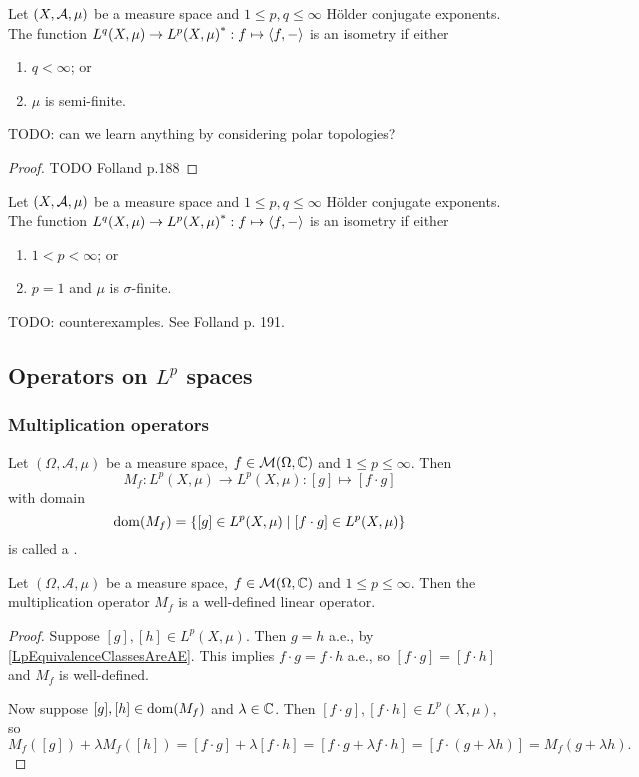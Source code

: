 \begin{proposition}
Let $\sSet{X, \mathcal{A}, \mu}$ be a measure space and $1 \leq p,q\leq \infty$ Hölder conjugate exponents. The function $L^q(X,\mu)\to {L^p(X,\mu)}^*: f \mapsto \left\langle f,- \right\rangle$ is an isometry if either
\begin{enumerate}
\item $q<\infty$; or
\item $\mu$ is semi-finite.
\end{enumerate}
\end{proposition}
TODO: can we learn anything by considering polar topologies?
\begin{proof}
TODO Folland p.188
\end{proof}

\begin{proposition}
Let $\sSet{X, \mathcal{A}, \mu}$ be a measure space and $1\leq p,q \leq \infty$ Hölder conjugate exponents. The function $L^q(X,\mu)\to {L^p(X,\mu)}^*: f \mapsto \left\langle f,- \right\rangle$ is an isometry if either
\begin{enumerate}
\item $1<p<\infty$; or
\item $p=1$ and $\mu$ is $\sigma$-finite.
\end{enumerate}
\end{proposition}

\begin{example}
TODO: counterexamples. See Folland p. 191.
\end{example}

\subsection{Operators on $L^p$ spaces}
\subsubsection{Multiplication operators}
\begin{definition}
Let $(\Omega, \mathcal{A}, \mu)$ be a measure space, $f\in \operatorname{\mathcal{M}}(\Omega, \mathbb{C})$ and $1\leq p \leq \infty$. Then
\[ M_f: L^p(X, \mu) \to L^p(X, \mu): [g]\mapsto [f\cdot g] \]
with domain
\[ \dom(M_f) = \setbuilder{[g]\in L^p(X, \mu)}{[f\cdot g] \in L^p(X, \mu)} \]
is called a .
\end{definition}

\begin{lemma}
Let $(\Omega, \mathcal{A}, \mu)$ be a measure space, $f\in \operatorname{\mathcal{M}}(\Omega, \mathbb{C})$ and $1\leq p \leq \infty$. Then the multiplication operator $M_f$ is a well-defined linear operator.
\end{lemma}
\begin{proof}
Suppose $[g], [h] \in L^p(X, \mu)$. Then $g = h$ a.e., by \ref{LpEquivalenceClassesAreAE}. This implies $f\cdot g = f\cdot h$ a.e., so $[f\cdot g] = [f\cdot h]$ and $M_f$ is well-defined.

Now suppose $[g],[h] \in \operatorname{dom}(M_f)$ and $\lambda \in \mathbb{C}$. Then $[f\cdot g], [f\cdot h] \in L^p(X, \mu)$, so
\[ M_f([g]) + \lambda M_f([h]) = [f\cdot g] + \lambda[f\cdot h] = [f\cdot g + \lambda f\cdot h] = [f\cdot(g+\lambda h)] = M_f(g+\lambda h). \]
\end{proof}


